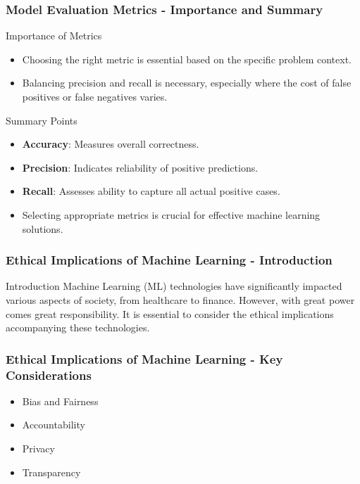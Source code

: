 \documentclass[aspectratio=169]{beamer}
\begin{document}
\begin{frame}[fragile]
    \frametitle{Model Evaluation Metrics - Importance and Summary}
    \begin{block}{Importance of Metrics}
        \begin{itemize}
            \item Choosing the right metric is essential based on the specific problem context.
            \item Balancing precision and recall is necessary, especially where the cost of false positives or false negatives varies.
        \end{itemize}
    \end{block}
    \begin{block}{Summary Points}
        \begin{itemize}
            \item \textbf{Accuracy}: Measures overall correctness.
            \item \textbf{Precision}: Indicates reliability of positive predictions.
            \item \textbf{Recall}: Assesses ability to capture all actual positive cases.
            \item Selecting appropriate metrics is crucial for effective machine learning solutions.
        \end{itemize}
    \end{block}
\end{frame}

\begin{frame}[fragile]
  \frametitle{Ethical Implications of Machine Learning - Introduction}
  \begin{block}{Introduction}
    Machine Learning (ML) technologies have significantly impacted various aspects of society, from healthcare to finance. However, with great power comes great responsibility. It is essential to consider the ethical implications accompanying these technologies.
  \end{block}
\end{frame}

\begin{frame}[fragile]
  \frametitle{Ethical Implications of Machine Learning - Key Considerations}
  \begin{itemize}
    \item Bias and Fairness
    \item Accountability
    \item Privacy
    \item Transparency
  \end{itemize}
\end{frame}
\end{document}
